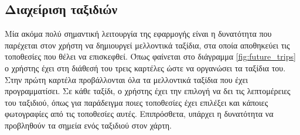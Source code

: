 \documentclass[oneside, 12pt]{book}
\begin{document}
\subsection{Διαχείριση ταξιδιών} \label{trip_management}
Μία ακόμα πολύ σημαντική λειτουργία της εφαρμογής είναι η δυνατότητα 
που παρέχεται στον χρήστη να δημιουργεί μελλοντικά ταξίδια, στα οποία 
αποθηκεύει τις τοποθεσίες που θέλει να επισκεφθεί.
Όπως φαίνεται στο διάγραμμα \ref{fig:future_trips} ο χρήστης έχει στη 
διάθεσή του τρεις καρτέλες ώστε να οργανώσει τα ταξίδια του.
Στην πρώτη καρτέλα προβάλλονται όλα τα μελλοντικά ταξίδια που έχει 
προγραμματίσει. Σε κάθε ταξίδι, ο χρήστης έχει την επιλογή να δει τις 
λεπτομέρειες του ταξιδιού, όπως για παράδειγμα ποιες τοποθεσίες έχει 
επιλέξει και κάποιες φωτογραφίες από τις τοποθεσίες αυτές. 
Επιπρόσθετα, υπάρχει η δυνατότητα να προβληθούν τα σημεία ενός ταξιδιού στον χάρτη.
\end{document}

